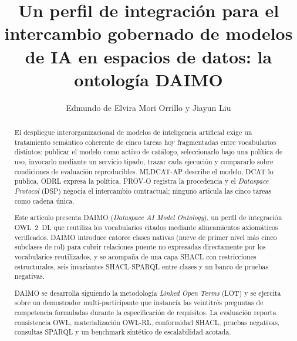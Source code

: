 \documentclass[Afour,sagev,times]{sagej}
\begin{document}

\title{Un perfil de integración para el intercambio gobernado de modelos de IA en espacios de datos: la ontología DAIMO}

\author{Edmundo de Elvira Mori Orrillo y Jiayun Liu}




\begin{abstract}
El despliegue interorganizacional de modelos de inteligencia artificial exige un tratamiento semántico coherente de cinco tareas hoy fragmentadas entre vocabularios distintos: publicar el modelo como activo de catálogo, seleccionarlo bajo una política de uso, invocarlo mediante un servicio tipado, trazar cada ejecución y compararlo sobre condiciones de evaluación reproducibles. MLDCAT-AP describe el modelo, DCAT lo publica, ODRL expresa la política, PROV-O registra la procedencia y el \emph{Dataspace Protocol} (DSP) negocia el intercambio contractual; ninguno articula las cinco tareas como cadena única.

Este artículo presenta DAIMO (\emph{Dataspace AI Model Ontology}), un perfil de integración OWL~2~DL que reutiliza los vocabularios citados mediante alineamientos axiomáticos verificados. DAIMO introduce catorce clases nativas (nueve de primer nivel más cinco subclases de rol) para cubrir relaciones puente no expresadas directamente por los vocabularios reutilizados, y se acompaña de una capa SHACL con restricciones estructurales, seis invariantes SHACL-SPARQL entre clases y un banco de pruebas negativas.

DAIMO se desarrolla siguiendo la metodología \emph{Linked Open Terms} (LOT) y se ejercita sobre un demostrador multi-participante que instancia las veintitrés preguntas de competencia formuladas durante la especificación de requisitos. La evaluación reporta consistencia OWL, materialización OWL-RL, conformidad SHACL, pruebas negativas, consultas SPARQL y un benchmark sintético de escalabilidad acotada.
\end{abstract}

\end{document}
